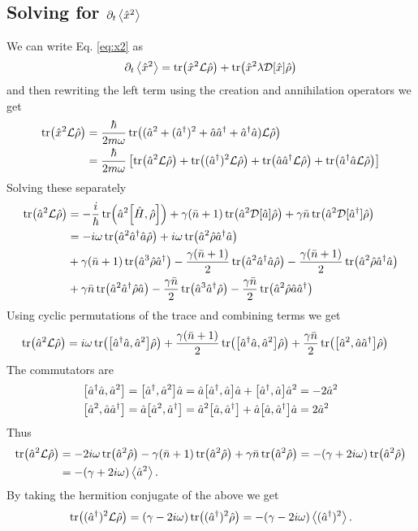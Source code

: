 \subsection{Solving for $\partial_t\expval{\hat{x}^2}$}
We can write Eq. \eqref{eq:x2} as 
\begin{equation}
    \partial_t\expval{\hat{x}^2} = \tr(\hat{x}^2 \mathcal{L}\hat{\rho}) + \tr(\hat{x}^2 \lambda \mathcal{D}[\hat{x}] \hat{\rho})\label{eq:x2b}
\end{equation}
and then rewriting the left term using the creation and annihilation operators we get
\begin{align}
    \tr(\hat{x}^2 \mathcal{L}\hat{\rho}) &= \frac{\hbar}{2m \omega} \tr((\hat{a}^2 + (\hat{a}^{\dagger})^2 + \hat{a}\hat{a}^{\dagger} + \hat{a}^{\dagger}\hat{a}) \mathcal{L}\hat{\rho} )\\ 
    &= \frac{\hbar}{2 m \omega} \left[ \tr(\hat{a}^2 \mathcal{L}\hat{\rho}) + \tr((\hat{a}^{\dagger})^2 \mathcal{L}\hat{\rho}) + \tr(\hat{a}\hat{a}^{\dagger} \mathcal{L}\hat{\rho}) + \tr(\hat{a}^{\dagger}\hat{a} \mathcal{L}\hat{\rho})\right]
\end{align}
Solving these separately
\begin{align}
    \tr(\a^2 \mathcal{L} \dmatrix) &= -\frac{i}{\hbar}\tr(\a^2\comm{\hamiltonian}{\dmatrix}) + \gamma(\nbar + 1)\tr(\a^2 \mathcal{D}[\a]\dmatrix) + \gamma \nbar \tr(\a^2 \mathcal{D}[\ad]\dmatrix)\\
    &= -i\omega \tr(\a^2 \ad\a \dmatrix) + i \omega \tr(\a^2\dmatrix \ad\a)\\ 
    &+ \gamma(\nbar + 1) \tr(\a^3 \dmatrix \ad)- \frac{\gamma(\nbar + 1)}{2} \tr(\a^2\ad\a \dmatrix) - \frac{\gamma(\nbar + 1)}{2} \tr(\a^2 \dmatrix \ad\a)\\
    &+ \gamma \nbar \tr(\a^2\ad \dmatrix \a) - \frac{\gamma \nbar}{2} \tr(\a^3 \ad \dmatrix) - \frac{\gamma \nbar}{2} \tr(\a^2 \dmatrix \a\ad)
\end{align}
Using cyclic permutations of the trace and combining terms we get
\begin{align}
    \tr(\a^2 \mathcal{L} \dmatrix) &=  i\omega \tr(\comm{\ad\a}{\a^2}\dmatrix) + \frac{\gamma (\nbar + 1)}{2} \tr(\comm{\ad\a}{\a^2}\dmatrix) + \frac{\gamma \nbar}{2}\tr(\comm{\a^2}{\a\ad}\dmatrix)
\end{align}
The commutators are
\begin{align}
    \comm{\ad\a}{\a^2} &= \comm{\ad}{\a^2}\a = \a\comm{\ad}{\a}\a + \comm{\ad}{\a}\a^2 = -2 \a^2 \\
    \comm{\a^2}{\a\ad} &= \a\comm{\a^2}{\ad} = \a^2 \comm{\a}{\ad}+ \a\comm{\a}{\ad}\a = 2\a^2
\end{align}
Thus
\begin{align}
    \tr(\hat{a}^2 \mathcal{L} \hat{\rho}) &=  -2i\omega \tr(\hat{a}^2 \hat{\rho}) - \gamma(\bar{n} + 1) \tr(\hat{a}^2 \hat{\rho}) + \gamma \bar{n} \tr(\hat{a}^2 \hat{\rho}) = -(\gamma + 2i\omega) \tr(\hat{a}^2 \hat{\rho})\\
    &= -(\gamma + 2i\omega) \expval{\hat{a}^2}.
\end{align}
By taking the hermition conjugate of the above we get
\begin{equation}
    \tr((\hat{a}^{\dagger})^2 \mathcal{L} \hat{\rho}) = (\gamma - 2i\omega) \tr((\hat{a}^{\dagger})^2 \hat{\rho}) = -(\gamma - 2i\omega) \expval{(\hat{a}^{\dagger})^2}.
\end{equation}

